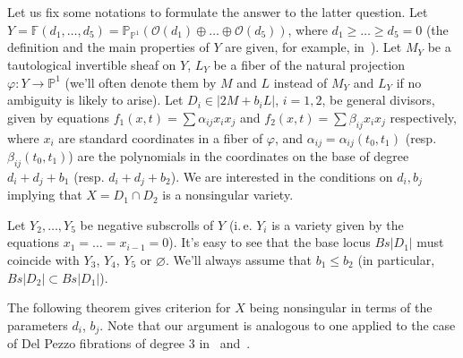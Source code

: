 \documentclass[12pt]{amsart}
\theoremstyle{definition}
\theoremstyle{remark}
\begin{document}
Let us fix some notations to formulate the answer to the latter question.
Let $Y={\mathbb{F}}(d_1, \ldots, d_5)={\mathbb{P}}_{{\mathbb{P}}^1}({\mathcal{O}}(d_1)\oplus\ldots\oplus{\mathcal{O}}(d_5))$,
where $d_1\geqslant\ldots\geqslant d_5=0$ (the definition and the main 
properties of $Y$ are given, for example, in~\cite{Reid}). Let $M_Y$ be a
tautological invertible sheaf on $Y$, $L_Y$ be a fiber of the natural projection
$\varphi:Y\to{\mathbb{P}}^1$
(we'll often denote them by $M$ and $L$ instead of $M_Y$ and $L_Y$ if no 
ambiguity is likely to arise). 
Let $D_i\in |2M+b_iL|$, $i=1, 2$, be general divisors, given by equations
$f_1(x, t)=\sum\alpha_{ij}x_ix_j$ and 
$f_2(x, t)=\sum\beta_{ij}x_ix_j$ respectively, where $x_i$ are standard
coordinates in a fiber of $\varphi$, and 
$\alpha_{ij}=\alpha_{ij}(t_0, t_1)$ 
(resp. $\beta_{ij}(t_0, t_1)$) are the polynomials in the coordinates 
on the base of degree $d_i+d_j+b_1$ (resp. $d_i+d_j+b_2$). 
We are interested in the conditions on $d_i, b_j$ implying that
$X=D_1\cap D_2$ is a nonsingular variety. 

Let $Y_2, \ldots, Y_5$ be negative subscrolls of $Y$
(i.\,e. $Y_i$ is a variety given by the equations  
$x_1=\ldots=x_{i-1}=0$). It's easy to see that the base locus
$Bs|D_1|$ must coincide with $Y_3$, $Y_4$, $Y_5$ or $\varnothing$.
We'll always assume that $b_1\leqslant b_2$ 
(in particular, $Bs|D_2|\subset Bs|D_1|$). 


The following theorem gives criterion for $X$ being nonsingular in terms of
the parameters $d_i$, $b_j$. 
Note that our argument is analogous to one applied to the case of Del
Pezzo fibrations of degree $3$ in~\cite[Lemma~26]{Cheltsov}  
and~\cite[Proposition~31, 32]{BrCoZu}.
\end{document}
